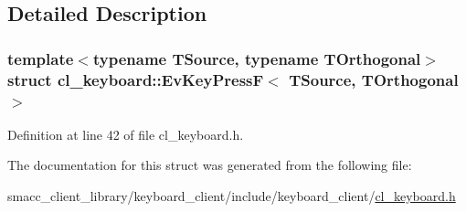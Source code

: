 \subsection{Detailed Description}
\subsubsection*{template$<$typename T\+Source, typename T\+Orthogonal$>$\newline
struct cl\+\_\+keyboard\+::\+Ev\+Key\+Press\+F$<$ T\+Source, T\+Orthogonal $>$}



Definition at line 42 of file cl\+\_\+keyboard.\+h.



The documentation for this struct was generated from the following file\+:\begin{DoxyCompactItemize}
\item 
smacc\+\_\+client\+\_\+library/keyboard\+\_\+client/include/keyboard\+\_\+client/\hyperlink{cl__keyboard_8h}{cl\+\_\+keyboard.\+h}\end{DoxyCompactItemize}
